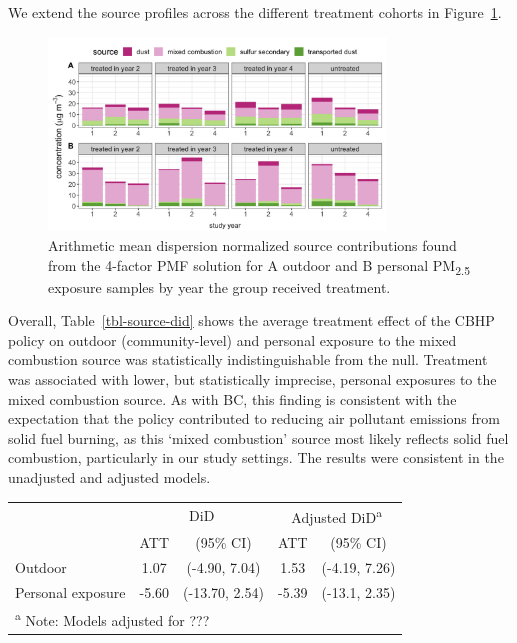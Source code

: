 \documentclass[
  letterpaper,
  DIV=11,
  numbers=noendperiod]{scrartcl}
\makeatletter
\renewenvironment{table}%
  {\renewcommand\familydefault\sfdefault
   \@float{table}}
  {\end@float}
\makeatother
\begin{document}
We extend the source profiles across the different treatment cohorts in
Figure~\ref{fig-source-season}.

\begin{figure}[H]

{\centering \includegraphics[width=0.8\textwidth,height=\textheight]{images/source-season.png}

}

\caption{\label{fig-source-season}Arithmetic mean dispersion normalized
source contributions found from the 4-factor PMF solution for A outdoor
and B personal PM\textsubscript{2.5} exposure samples by year the group
received treatment.}

\end{figure}

Overall, Table~\ref{tbl-source-did} shows the average treatment effect
of the CBHP policy on outdoor (community-level) and personal exposure to
the mixed combustion source was statistically indistinguishable from the
null. Treatment was associated with lower, but statistically imprecise,
personal exposures to the mixed combustion source. As with BC, this
finding is consistent with the expectation that the policy contributed
to reducing air pollutant emissions from solid fuel burning, as this
`mixed combustion' source most likely reflects solid fuel combustion,
particularly in our study settings. The results were consistent in the
unadjusted and adjusted models.

\hypertarget{tbl-source-did}{}
\begin{table}
\caption{\label{tbl-source-did}Average treatment effect (µg/m\textsuperscript{3}) for outdoor and
personal exposure to the mixed combustion source. }\tabularnewline

\centering
\begin{tabular}{lcccc}
\toprule
\multicolumn{1}{c}{ } & \multicolumn{2}{c}{DiD} & \multicolumn{2}{c}{Adjusted DiD\textsuperscript{a}} \\
\cmidrule(l{3pt}r{3pt}){2-3} \cmidrule(l{3pt}r{3pt}){4-5}
  & ATT & (95\% CI) & ATT & (95\% CI)\\
\midrule
Outdoor & 1.07 & (-4.90, 7.04) & 1.53 & (-4.19, 7.26)\\
Personal exposure & -5.60 & (-13.70, 2.54) & -5.39 & (-13.1, 2.35)\\
\bottomrule
\multicolumn{5}{l}{\rule{0pt}{1em}\textsuperscript{a} \small{Note: Models adjusted for ???}}\\
\end{tabular}
\end{table}
\end{document}
